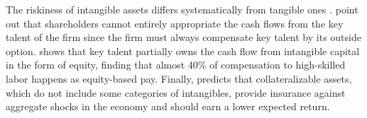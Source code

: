 \documentclass[12pt, letterpaper]{article}
\begin{document}
%
%

The riskiness of intangible assets differs systematically from tangible ones \citep{Hansen2005-xe}. \cite{Eisfeldt2013-ad} point out that shareholders cannot entirely appropriate the cash flows from the key talent of the firm since the firm must always compensate key talent by its outside option. \cite{Eisfeldt2018-iy} shows that key talent partially owns the cash flow from intangible capital in the form of equity, finding that almost 40\% of compensation to high-skilled labor happens as equity-based pay. Finally, \cite{Ai2019-wd} predicts that collateralizable assets, which do not include some categories of intangibles, provide insurance against aggregate shocks in the economy and should earn a lower expected return.
\end{document}
